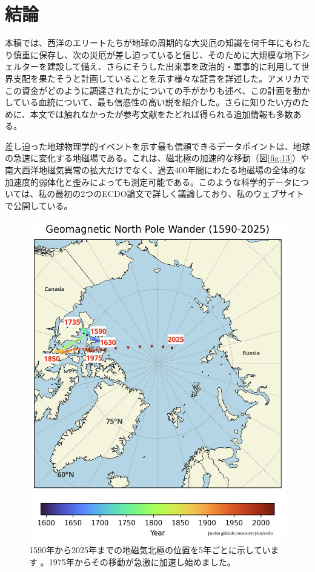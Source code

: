 \documentclass[10pt,twocolumn,letterpaper]{article}
\begin{document}
\section{結論}

本稿では、西洋のエリートたちが地球の周期的な大災厄の知識を何千年にもわたり慎重に保存し、次の災厄が差し迫っていると信じ、そのために大規模な地下シェルターを建設して備え、さらにそうした出来事を政治的・軍事的に利用して世界支配を果たそうと計画していることを示す様々な証言を詳述した。アメリカでこの資金がどのように調達されたかについての手がかりも述べ、この計画を動かしている血統について、最も信憑性の高い説を紹介した。さらに知りたい方のために、本文では触れなかったが参考文献をたどれば得られる追加情報も多数ある。

差し迫った地球物理学的イベントを示す最も信頼できるデータポイントは、地球の急速に変化する地磁場である。これは、磁北極の加速的な移動（図\ref{fig:13}）や南大西洋地磁気異常の拡大だけでなく、過去400年間にわたる地磁場の全体的な加速度的弱体化と歪みによっても測定可能である\cite{3}。このような科学的データについては、私の最初の2つのECDO論文で詳しく議論しており、私のウェブサイトで公開している\cite{3}。

\begin{figure}[t]
\begin{center}
   \includegraphics[width=1\linewidth]{npw.jpg}
\end{center}
   \caption{1590年から2025年までの地磁気北極の位置を5年ごとに示しています \cite{41}。1975年からその移動が急激に加速し始めました。}
\label{fig:13}
\label{fig:onecol}
\end{figure}
\end{document}

